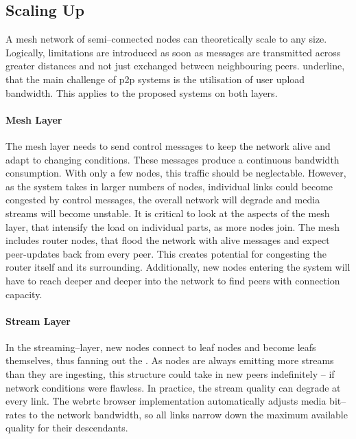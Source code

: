 \subsection{Scaling Up}\label{sec:scaling}
A mesh network of semi–connected nodes can theoretically scale to any size. Logically, limitations are introduced as soon as messages are transmitted across greater distances and not just exchanged between neighbouring peers. \citet[p. 748-750]{tanenbaum_wetherall_2011} underline, that the main challenge of \gls{p2p} systems is the utilisation of user upload bandwidth. This applies to the proposed systems on both layers.

\paragraph{Mesh Layer}\label{par:scaling-mesh}
The mesh layer needs to send control messages to keep the network alive and adapt to changing conditions. These messages produce a continuous bandwidth consumption. With only a few nodes, this traffic should be neglectable. However, as the system takes in larger numbers of nodes, individual links could become congested by control messages, the overall network will degrade and media streams will become unstable. It is critical to look at the aspects of the mesh layer, that intensify the load on individual parts, as more nodes join.
The mesh includes router nodes, that flood the network with alive messages and expect \glspl{peer-update} back from every peer. This creates potential for congesting the router itself and its surrounding. Additionally, new nodes entering the system will have to reach deeper and deeper into the network to find peers with connection capacity.

\paragraph{Stream Layer}\label{par:scaling-stream}
In the streaming–layer, new nodes connect to leaf nodes and become leafs themselves, thus fanning out the . As nodes are always emitting more streams than they are ingesting, this structure could take in new peers indefinitely – if network conditions were flawless. In practice, the stream quality can degrade at every link. The \gls{webrtc} browser implementation automatically adjusts media bit–rates to the network bandwidth, so all links narrow down the maximum available quality for their descendants.


